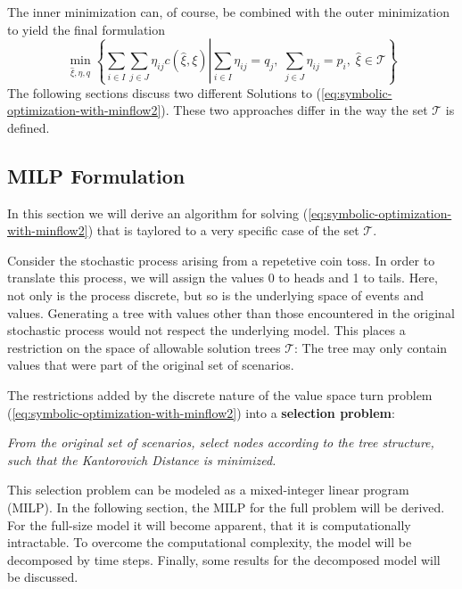 \documentclass[a4paper, 12pt] {article}
\begin{document}
The inner minimization can, of course, be combined with the outer minimization to yield the final formulation
\begin{equation}
  \label{eq:symbolic-optimization-with-minflow2}
  \min_{\hat{\xi},\eta,q}\left\{\sum_{i\in I}\sum_{j\in J}\eta_{ij}c(\hat{\xi}, \xi)\left|\sum_{i\in I}\eta_{ij}=q_j,\;\sum_{j\in J}\eta_{ij}=p_i,\;\hat{\xi} \in \mathcal{T}\right.\right\}
\end{equation}
The following sections discuss two different Solutions to (\ref{eq:symbolic-optimization-with-minflow2}). These two approaches differ in the way the set $\mathcal{T}$ is defined.

\subsection{MILP Formulation}
\label{sec:MILP-selection-problem}
In this section we will derive an algorithm for solving (\ref{eq:symbolic-optimization-with-minflow2}) that is taylored to a very specific case of the set $\mathcal{T}$.

Consider the stochastic process arising from a repetetive coin toss. In order to translate this process, we will assign the values 0 to heads and 1 to tails. Here, not only is the process discrete, but so is the underlying space of events and values. Generating a tree with values other than those encountered in the original stochastic process would not respect the underlying model. This places a restriction on the space of allowable solution trees $\mathcal{T}$: The tree may only contain values that were part of the original set of scenarios.

The restrictions added by the discrete nature of the value space turn problem (\ref{eq:symbolic-optimization-with-minflow2}) into a \textbf{selection problem}:
\begin{center}
  \textit{From the original set of scenarios, select nodes according to the tree structure, such that the Kantorovich Distance is minimized.}
\end{center}
This selection problem can be modeled as a mixed-integer linear program (MILP). In the following section, the MILP for the full problem will be derived. For the full-size model it will become apparent, that it is computationally intractable. To overcome the computational complexity, the model will be decomposed by time steps. Finally, some results for the decomposed model will be discussed.
\end{document}
